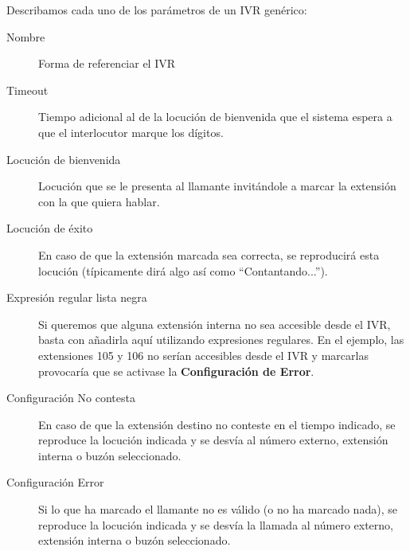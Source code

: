 \documentclass[letterpaper,10pt,spanish]{sphinxmanual}
\begin{document}
\noindent{}

Describamos cada uno de los parámetros de un IVR genérico:
\begin{description}
\item[{Nombre}] \leavevmode{}\label{pbx_features/ivrs:term-nombre}
Forma de referenciar el IVR

\item[{Timeout}] \leavevmode{}\label{pbx_features/ivrs:term-timeout}
Tiempo adicional al de la locución de bienvenida que el sistema espera a que el interlocutor marque los dígitos.

\item[{Locución de bienvenida}] \leavevmode{}\label{pbx_features/ivrs:term-locucion-de-bienvenida}
Locución que se le presenta al llamante invitándole a marcar la extensión con la que quiera hablar.

\item[{Locución de éxito}] \leavevmode{}\label{pbx_features/ivrs:term-locucion-de-exito}
En caso de que la extensión marcada sea correcta, se reproducirá esta locución (típicamente dirá algo así como ``Contantando...'').

\item[{Expresión regular lista negra}] \leavevmode{}\label{pbx_features/ivrs:term-expresion-regular-lista-negra}
Si queremos que alguna extensión interna no sea accesible desde el IVR, basta con añadirla aquí utilizando expresiones regulares. En el ejemplo, las extensiones 105 y 106 no serían accesibles desde el IVR y marcarlas provocaría que se activase la \textbf{Configuración de Error}.

\item[{Configuración No contesta}] \leavevmode{}\label{pbx_features/ivrs:term-configuracion-no-contesta}
En caso de que la extensión destino no conteste en el tiempo indicado, se reproduce la locución indicada y se desvía al número externo, extensión interna o buzón seleccionado.

\item[{Configuración Error}] \leavevmode{}\label{pbx_features/ivrs:term-configuracion-error}
Si lo que ha marcado el llamante no es válido (o no ha marcado nada), se reproduce la locución indicada y se desvía la llamada al número externo, extensión interna o buzón seleccionado.

\end{description}
\end{document}
